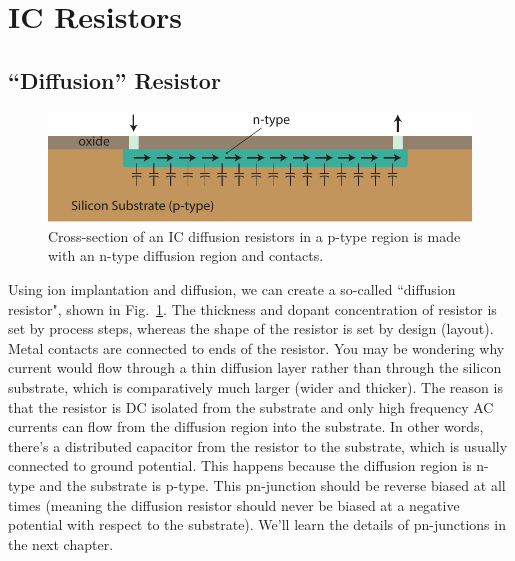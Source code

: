 \section{IC Resistors}
\subsection{“Diffusion” Resistor}
\begin{figure}[tb]
\centering
\includegraphics[width=.7\columnwidth]{diff_resistor}
\caption{Cross-section of an IC diffusion resistors in a p-type region is made with an n-type diffusion region and contacts.}
\label{fig:mod2-2_ICtech_sld_5}
\end{figure}
Using ion implantation and diffusion, we can create a so-called ``diffusion resistor", shown in Fig.~\ref{fig:mod2-2_ICtech_sld_5}.  The thickness and dopant concentration of resistor is set by process steps, whereas the shape of the resistor is set by design (layout).   Metal contacts are connected to ends of the resistor.  You may be wondering why current would flow through a thin diffusion layer rather than through the silicon substrate, which is comparatively much larger (wider and thicker).  The reason is that the resistor is DC isolated from the substrate and only high frequency AC currents can flow from the diffusion region into the substrate.  In other words, there's a distributed capacitor from the resistor to the substrate, which is usually connected to ground potential.  This happens because the diffusion region is n-type and the substrate is p-type.  This pn-junction should be reverse biased at all times (meaning the diffusion resistor should never be biased at a negative potential with respect to the substrate).  We'll learn the details of pn-junctions in the next chapter.
